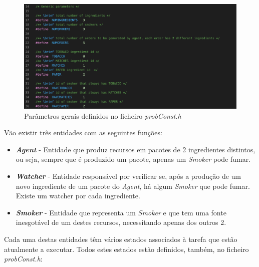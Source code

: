 \documentclass[10pt,portuguese]{article}
\begin{document}
\begin{figure}[!h]
    \centering
    \includegraphics[scale=0.5]{images/Problem/generalparame.png}
    \caption{Parâmetros gerais definidos no ficheiro \textit{probConst.h}}
\end{figure}

\clearpage

\par Vão existir três entidades com as seguintes funções:
\begin{itemize}
  \item \textit{\textbf{Agent}} - Entidade que produz recursos em pacotes de 2 ingredientes distintos, ou seja, sempre que é produzido um pacote, apenas um \textit{Smoker} pode fumar. 
  \item \textit{\textbf{Watcher}} - Entidade responsável por verificar se, após a produção de um novo ingrediente de um pacote do \textit{Agent}, há algum \textit{Smoker} que pode fumar. Existe um watcher por cada ingrediente.
  \item \textit{\textbf{Smoker}} - Entidade que representa um \textit{Smoker} e que tem uma fonte inesgotável de um destes recursos, necessitando apenas dos outros 2.
\end{itemize}
\par Cada uma destas entidades têm vários estados associados à tarefa que estão atualmente a executar. Todos estes estados estão definidos, também, no ficheiro \textit{probConst.h}:
\end{document}
